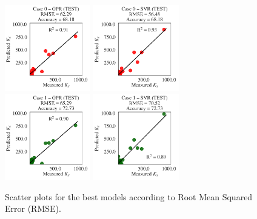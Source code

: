 \documentclass[a4paper,12pt, english]{article}
\begin{document}
\begin{figure}[!] \centering 
 \includegraphics[width=0.33245\textwidth]{./scatter/eml____300dpi_scatter_best_model___gpr__case_0__test}
 \includegraphics[width=0.33245\textwidth]{./scatter/eml____300dpi_scatter_best_model___svr__case_0__test}
 \includegraphics[width=0.33245\textwidth]{./scatter/eml____300dpi_scatter_best_model___gpr__case_1__test}
 \includegraphics[width=0.33245\textwidth]{./scatter/eml____300dpi_scatter_best_model___svr__case_1__test}
 \caption{\label{fig:eml____300dpi_scatter_best_model___ldc}
 Scatter plots for the best models according to Root Mean Squared Error (RMSE).}
\end{figure}
 
\end{document}
